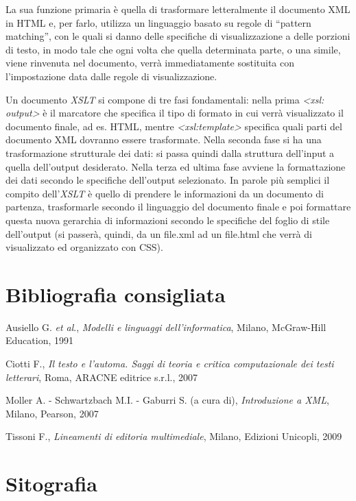 \documentclass[
  b5paper,
  twoside,
  12pt,
  chapterprefix=false,
  bibliography=totocnumbered,
  parskip=false]{scrbook}
\begin{document}
La sua funzione primaria è quella di trasformare letteralmente il
documento XML in HTML e, per farlo, utilizza un linguaggio basato su
regole di \enquote{pattern matching}, con le quali si danno delle specifiche di
visualizzazione a delle porzioni di testo, in modo tale che ogni volta
che quella determinata parte, o una simile, viene rinvenuta nel
documento, verrà immediatamente sostituita con l'impostazione data dalle
regole di visualizzazione.

Un documento \emph{XSLT} si compone di tre fasi fondamentali: nella prima
\emph{\textless xsl: output\textgreater{}} è il marcatore che specifica il tipo di formato in cui
verrà visualizzato il documento finale, ad es. HTML, mentre
\emph{\textless xsl:template\textgreater{}} specifica quali parti del documento XML dovranno
essere trasformate. Nella seconda fase si ha una trasformazione
strutturale dei dati: si passa quindi dalla struttura dell'input a
quella dell'output desiderato. Nella terza ed ultima fase avviene la
formattazione dei dati secondo le specifiche dell'output selezionato. In
parole più semplici il compito dell'\emph{XSLT} è quello di prendere le
informazioni da un documento di partenza, trasformarle secondo il
linguaggio del documento finale e poi formattare questa nuova gerarchia
di informazioni secondo le specifiche del foglio di stile dell'output
(si passerà, quindi, da un file.xml ad un file.html che verrà di
visualizzato ed organizzato con CSS).

\hypertarget{bibliografia-consigliata-27}{%
\section*{Bibliografia consigliata}\label{bibliografia-consigliata-27}}

Ausiello G. \emph{et al}., \emph{Modelli e linguaggi dell'informatica}, Milano,
McGraw-Hill Education, 1991

Ciotti F., \emph{Il testo e l'automa. Saggi di teoria e critica
computazionale dei testi letterari}, Roma, ARACNE editrice s.r.l., 2007

Moller A. - Schwartzbach M.I. - Gaburri S. (a cura di), \emph{Introduzione a
XML}, Milano, Pearson, 2007

Tissoni F., \emph{Lineamenti di editoria multimediale}, Milano, Edizioni
Unicopli, 2009

\hypertarget{sitografia-35}{%
\section*{Sitografia}\label{sitografia-35}}
\end{document}
